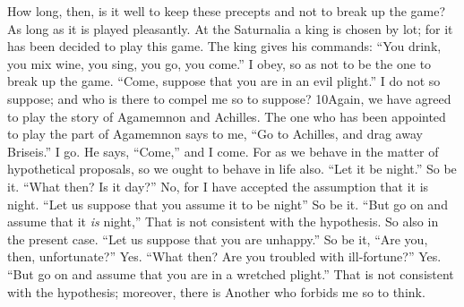 How long, then, is it well to keep these precepts and not to break up the game? As long as it is played pleasantly. At the Saturnalia a king is chosen by lot; for it has been decided to play this game. The king gives his commands: ``You drink, you mix wine, you sing, you go, you come.'' I obey, so as not to be the one to break up the game. ``Come, suppose that you are in an evil plight.'' I do not so suppose; and who is there to compel me so to suppose? 10Again, we have agreed to play the story of Agamemnon and Achilles. The one who has been appointed to play the part of Agamemnon says to me, ``Go to Achilles, and drag away Briseis.'' I go. He says, ``Come,'' and I come. For as we behave in the matter of hypothetical proposals, so we ought to behave in life also. ``Let it be night.'' So be it. ``What then? Is it day?'' No, for I have accepted the assumption that it is night. ``Let us suppose that you assume it to be night'' So be it. ``But go on and assume that it \emph{is} night,'' That is not consistent with the hypothesis. So also in the present case. ``Let us suppose that you are unhappy.'' So be it, ``Are you, then, unfortunate?'' Yes. ``What then? Are you troubled with ill-fortune?'' Yes. ``But go on and assume that you are in a wretched plight.'' That is not consistent with the hypothesis; moreover, there is Another who forbids me so to think.

